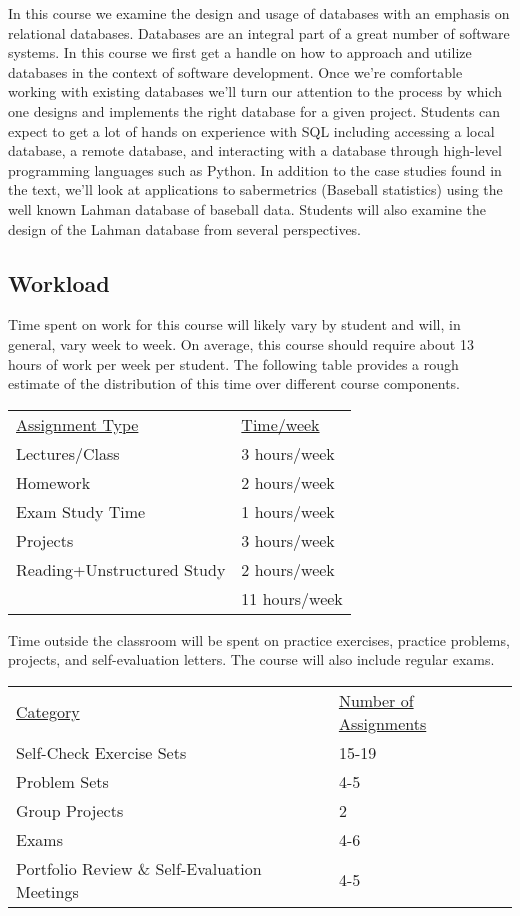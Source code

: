 \documentclass[10pt]{article}
\begin{document}
In this course we examine the design and usage of databases with an emphasis on relational databases. Databases are an integral part of a great number of software systems. In this course we first get a handle on how to approach and utilize databases in the context of software development. Once we're comfortable working with existing databases we'll turn our attention to the process by which one designs and implements the right database for a given project. Students can expect to get a lot of hands on experience with SQL including accessing a local database, a remote database, and interacting with a database through high-level programming languages such as Python.  In addition to the case studies found in the text, we'll look at applications to sabermetrics (Baseball statistics) using the well known Lahman database of baseball data. Students will also examine the design of the Lahman database from several perspectives.



\subsection{Workload}

Time spent on work for this course will likely vary by student and will, in general, vary week to week. On average, this course should require about 13 hours of work per week per student.  The following table provides a rough estimate of the distribution of this time over different course components.
\begin{center}
\begin{tabular}{ll}
\underline{Assignment Type} & \underline{Time/week} \\
Lectures/Class       & 3 hours/week \\
Homework          &  2 hours/week \\
Exam Study Time    &  1 hours/week \\
Projects          &  3 hours/week \\
Reading+Unstructured Study &  2 hours/week \\
\bottomrule
 & 11  hours/week
\end{tabular}
\end{center}

Time outside the classroom will be spent on practice exercises, practice problems, projects, and self-evaluation letters. The course will also include regular exams.
\begin{center}
  \begin{tabular}{ll}
    \underline{Category} & \underline{Number of Assignments} \\
    Self-Check Exercise Sets &  15-19 \\
    Problem Sets & 4-5 \\ 
    Group Projects & 2 \\
    Exams & 4-6\\
    Portfolio Review \& Self-Evaluation Meetings & 4-5
  \end{tabular}
\end{center}
\end{document}
